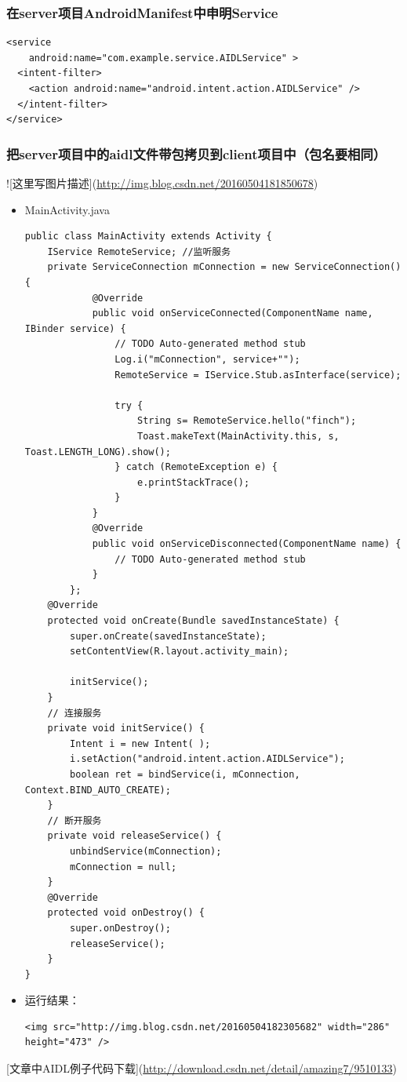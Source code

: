 \documentclass[9pt, b5paper]{article}
\begin{document}
\subsubsection{在server项目AndroidManifest中申明Service}
\label{sec-6-4-3}
\begin{verbatim}
<service 
    android:name="com.example.service.AIDLService" >
  <intent-filter>  
    <action android:name="android.intent.action.AIDLService" />  
  </intent-filter> 
</service>
\end{verbatim}
\subsubsection{把server项目中的aidl文件带包拷贝到client项目中（包名要相同）}
\label{sec-6-4-4}
![这里写图片描述](\url{http://img.blog.csdn.net/20160504181850678}) 
\begin{itemize}
\item MainActivity.java
\begin{verbatim}
public class MainActivity extends Activity {
    IService RemoteService; //监听服务
    private ServiceConnection mConnection = new ServiceConnection() {
            @Override
            public void onServiceConnected(ComponentName name, IBinder service) {
                // TODO Auto-generated method stub
                Log.i("mConnection", service+"");
                RemoteService = IService.Stub.asInterface(service);
            
                try {
                    String s= RemoteService.hello("finch");
                    Toast.makeText(MainActivity.this, s, Toast.LENGTH_LONG).show();
                } catch (RemoteException e) {
                    e.printStackTrace();
                }
            }
            @Override
            public void onServiceDisconnected(ComponentName name) {
                // TODO Auto-generated method stub
            }
        };
    @Override
    protected void onCreate(Bundle savedInstanceState) {
        super.onCreate(savedInstanceState);
        setContentView(R.layout.activity_main);
        
        initService();
    }
    // 连接服务
    private void initService() {
        Intent i = new Intent( );
        i.setAction("android.intent.action.AIDLService");
        boolean ret = bindService(i, mConnection, Context.BIND_AUTO_CREATE);
    }
    // 断开服务
    private void releaseService() {
        unbindService(mConnection);
        mConnection = null;
    }
    @Override
    protected void onDestroy() {
        super.onDestroy();
        releaseService();
    }
}
\end{verbatim}
\item 运行结果：
\begin{verbatim}
<img src="http://img.blog.csdn.net/20160504182305682" width="286" height="473" />
\end{verbatim}
\end{itemize}
[文章中AIDL例子代码下载](\url{http://download.csdn.net/detail/amazing7/9510133})
\end{document}
